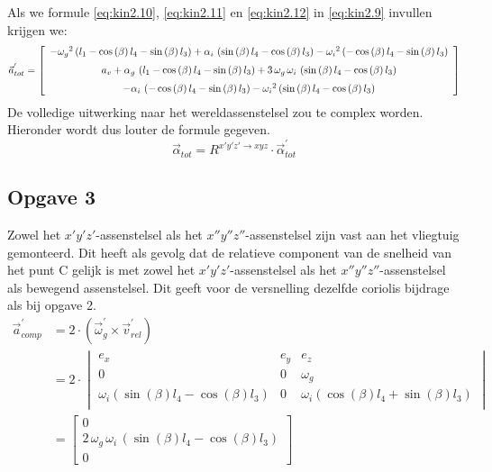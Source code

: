 Als we formule \eqref{eq:kin2.10}, \eqref{eq:kin2.11} en \eqref{eq:kin2.12} in \eqref{eq:kin2.9} invullen krijgen we:
\begin{equation}
\vec{a}_{tot}^{'}=\left[ \begin {array}{c} -{\omega_{g}}^{2} \left( l_{1}-\cos \left( 
\beta \right) l_{4}-\sin \left( \beta \right) l_{3} \right) +\alpha_{i
}\, \left( \sin \left( \beta \right) l_{4}-\cos \left( \beta \right) l
_{3} \right) -{\omega_{i}}^{2} \left( -\cos \left( \beta \right) l_{4}
-\sin \left( \beta \right) l_{3} \right) \\ \noalign{\medskip}a_{v}+
\alpha_{g}\, \left( l_{1}-\cos \left( \beta \right) l_{4}-\sin \left( 
\beta \right) l_{3} \right) +3\,\omega_{g}\,\omega_{i}\, \left( \sin
 \left( \beta \right) l_{4}-\cos \left( \beta \right) l_{3} \right) 
\\ \noalign{\medskip}-\alpha_{i}\, \left( -\cos \left( \beta \right) l
_{4}-\sin \left( \beta \right) l_{3} \right) -{\omega_{i}}^{2} \left( 
\sin \left( \beta \right) l_{4}-\cos \left( \beta \right) l_{3}
 \right) \end {array} \right]
\label{eq:kin2.15}
\end{equation}
De volledige uitwerking naar het wereldassenstelsel zou te complex worden. Hieronder wordt dus louter de formule gegeven.
\begin{equation}
\vec{\alpha}_{tot}=R^{x'y'z' \rightarrow xyz}\cdot\vec{\alpha}_{tot}^{'}
\end{equation}
\newpage
\subsection{Opgave 3}
Zowel het $x'y'z'$-assenstelsel als het $x''y''z''$-assenstelsel zijn vast aan het vliegtuig gemonteerd. Dit heeft als gevolg dat de relatieve component van de snelheid van het punt C gelijk is met zowel het $x'y'z'$-assenstelsel als het $x''y''z''$-assenstelsel als bewegend assenstelsel. Dit geeft voor de versnelling dezelfde coriolis bijdrage als bij opgave 2.
\begin{equation}
\begin{split}
\vec{a}_{comp}^{'}&=2\cdot(\vec{\omega}_{g}^{'}\times\vec{v}_{rel}^{'})\\
&=2\cdot
\begin{vmatrix}
e_{x}&e_{y}&e_{z}\\
0&0&\omega_{g}\\
\omega_{i}(\sin(\beta)l_{4}-\cos(\beta)l_{3})&0&\omega_{i}(\cos(\beta)l_{4}+\sin(\beta)l_{3})\\
\end{vmatrix}\\
&=\left[ \begin {array}{c} 0\\2\,\omega_{g}\,\omega_
{i}\, \left( \sin \left( \beta \right) l_{4}-\cos \left( \beta
 \right) l_{3} \right) \\ 0\end {array} \right]
\end{split}
\label{eq:kin3.1}
\end{equation}
\newpage
